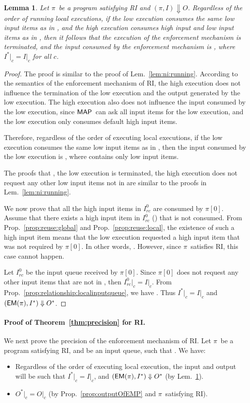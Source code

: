 \documentclass[10pt,a4paper,oneside]{article}
\newtheorem{lemma}{Lemma}[section]
\def\execution#1#2#3{\ensuremath{(#1, #2)\Downarrow#3}}
\def\Irc#1{\ensuremath{I_{rc}^{#1}}}
\def\channeleq#1#2#3{\ensuremath{\restrict{#1}{#3} = \restrict{#2}{#3}}}
\def\restrict#1#2{\ensuremath{{#1}|_{#2}}}
\def\chnl{\ensuremath{c}}
\def\sanserif#1{\ensuremath{\sf #1}}
\def\MAP{\ensuremath{\sanserif{MAP}}}
\def\EM{\ensuremath{{\sanserif{EM}}}}
\def\Prog{\ensuremath{\pi}}
\def\Progl#1{\ensuremath{\Prog[#1]}}
\def\EMP{\ensuremath{\EM(}\ensuremath{\Prog)}}
\begin{document}
\begin{lemma} \label{lem:ri:running}
Let \Prog\ be a program satisfying RI and \execution{\Prog}{I}{O}. Regardless of the order of running local executions, if the low execution consumes the same low input items as in , and the high execution consumes high input and low input items as in , then it follows that the execution of the enforcement mechanism is terminated, and the input consumed by the enforcement mechanism is , where \channeleq{I^*}{I}{\chnl} for all \chnl.
\end{lemma}
\begin{proof}
The proof is similar to the proof of Lem.~\ref{lem:ni:running}.
According to the semantics of the enforcement mechanism of RI, the high execution does not influence the termination of the low execution and the output generated by the low execution. The high execution also does not influence the input consumed by the low execution, since \MAP\ can ask all input items for the low execution,  and the low execution only consumes default high input items.

Therefore, regardless of the order of executing local executions, if the low execution consumes the same low input items as in , then the input consumed by the low execution is , where  contains only low input items.

The proofs that , the low execution is terminated, the high execution does not request any other low input items not in  are similar to the proofs in Lem.~\ref{lem:ni:running}.

We now prove that all the high input items in \Irc{0} are consumed by \Progl{0}. Assume that there exists a high input item  in \Irc{0} () that is not consumed. From Prop.~\ref{prop:reuse:global} and Prop.~\ref{prop:reuse:local}, the existence of such a high input item means that the low execution requested a high input item that was not required by \Progl{0}. In other words, . However, since \Prog\ satisfies RI, this case cannot happen.


Let \Irc{0} be the input queue received by \Progl{0}. Since \Progl{0} does not request any other input items that are not in , then \channeleq{\Irc{0}}{I}{\chnl}. From Prop.~\ref{prop:relationship:localinputqueue},  we have . Thus \channeleq{I^*}{I}{\chnl} and \execution{\EMP}{I^*}{O^*}.
\end{proof}

\paragraph{Proof of Theorem~\ref{thm:precision} for RI.}
We next prove the precision of the enforcement mechanism of RI. Let \Prog\ be a program satisfying RI, and  be an input queue, such that . We have:
\begin{itemize}
\item Regardless of the order of executing local execution, the input  and output  will be such that \channeleq{I^*}{I}{\chnl}, and \execution{\EMP}{I^*}{O^*} (by Lem.~\ref{lem:ri:running}).
\item \channeleq{O^*}{O}{\chnl} (by Prop.~\ref{prop:outputOfEMP} and \Prog\ satisfying RI).
\end{itemize}
\end{document}

